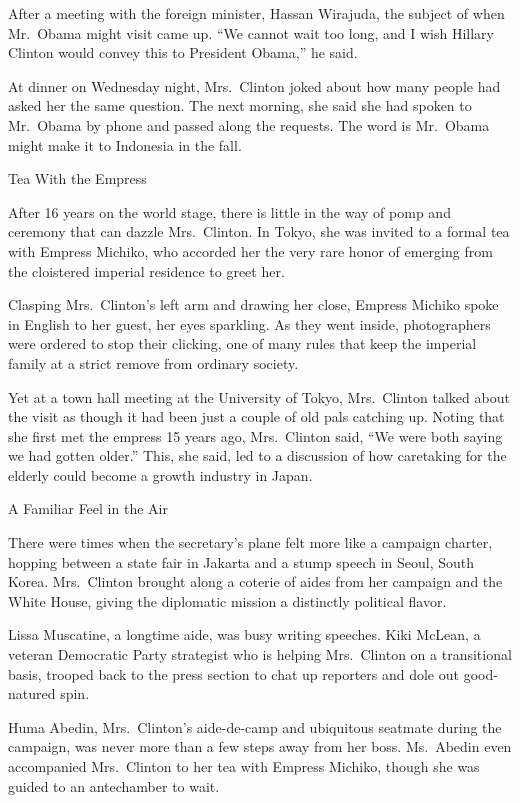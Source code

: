 \documentclass[12pt,a4paper,onecolumn]{article}
\begin{document}
\begin{CJK*}{GBK}{song}
After a meeting with the foreign minister, Hassan Wirajuda, the subject of when Mr.~Obama might
visit came up. ``We cannot wait too long, and I wish Hillary Clinton would convey this to President
Obama,'' he said.

At dinner on Wednesday night, Mrs.~Clinton joked about how many people had asked her the same
question. The next morning, she said she had spoken to Mr.~Obama by phone and passed along the
requests. The word is Mr.~Obama might make it to Indonesia in the fall.

Tea With the Empress

After 16 years on the world stage, there is little in the way of pomp and ceremony that can dazzle
Mrs.~Clinton. In Tokyo, she was invited to a formal tea with Empress Michiko, who accorded her the
very rare honor of emerging from the cloistered imperial residence to greet her.

Clasping Mrs.~Clinton's left arm and drawing her close, Empress Michiko spoke in English to her
guest, her eyes sparkling. As they went inside, photographers were ordered to stop their clicking,
one of many rules that keep the imperial family at a strict remove from ordinary society.

Yet at a town hall meeting at the University of Tokyo, Mrs.~Clinton talked about the visit as though
it had been just a couple of old pals catching up. Noting that she first met the empress 15 years
ago, Mrs.~Clinton said, ``We were both saying we had gotten older.'' This, she said, led to a
discussion of how caretaking for the elderly could become a growth industry in Japan.

A Familiar Feel in the Air

There were times when the secretary's plane felt more like a campaign charter, hopping between a
state fair in Jakarta and a stump speech in Seoul, South Korea. Mrs.~Clinton brought along a coterie
of aides from her campaign and the White House, giving the diplomatic mission a distinctly political
flavor.

Lissa Muscatine, a longtime aide, was busy writing speeches. Kiki McLean, a veteran Democratic Party
strategist who is helping Mrs.~Clinton on a transitional basis, trooped back to the press section to
chat up reporters and dole out good-natured spin.

Huma Abedin, Mrs.~Clinton's aide-de-camp and ubiquitous seatmate during the campaign, was never more
than a few steps away from her boss. Ms.~Abedin even accompanied Mrs.~Clinton to her tea with
Empress Michiko, though she was guided to an antechamber to wait.


\end{CJK*}
\end{document}

